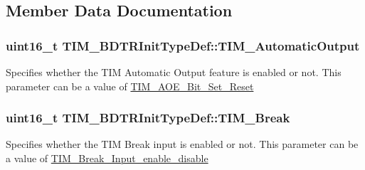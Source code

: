 \subsection{Member Data Documentation}
\subsubsection[{\texorpdfstring{T\+I\+M\+\_\+\+Automatic\+Output}{TIM_AutomaticOutput}}]{\setlength{\rightskip}{0pt plus 5cm}uint16\+\_\+t T\+I\+M\+\_\+\+B\+D\+T\+R\+Init\+Type\+Def\+::\+T\+I\+M\+\_\+\+Automatic\+Output}\hypertarget{struct_t_i_m___b_d_t_r_init_type_def_a6c056e29af67fd8a32919104ea48eea2}{}\label{struct_t_i_m___b_d_t_r_init_type_def_a6c056e29af67fd8a32919104ea48eea2}
Specifies whether the T\+IM Automatic Output feature is enabled or not. This parameter can be a value of \hyperlink{group___t_i_m___a_o_e___bit___set___reset}{T\+I\+M\+\_\+\+A\+O\+E\+\_\+\+Bit\+\_\+\+Set\+\_\+\+Reset} 
\subsubsection[{\texorpdfstring{T\+I\+M\+\_\+\+Break}{TIM_Break}}]{\setlength{\rightskip}{0pt plus 5cm}uint16\+\_\+t T\+I\+M\+\_\+\+B\+D\+T\+R\+Init\+Type\+Def\+::\+T\+I\+M\+\_\+\+Break}\hypertarget{struct_t_i_m___b_d_t_r_init_type_def_a9fcf20632d0377727476a98f7183be56}{}\label{struct_t_i_m___b_d_t_r_init_type_def_a9fcf20632d0377727476a98f7183be56}
Specifies whether the T\+IM Break input is enabled or not. This parameter can be a value of \hyperlink{group___t_i_m___break___input__enable__disable}{T\+I\+M\+\_\+\+Break\+\_\+\+Input\+\_\+enable\+\_\+disable} 
